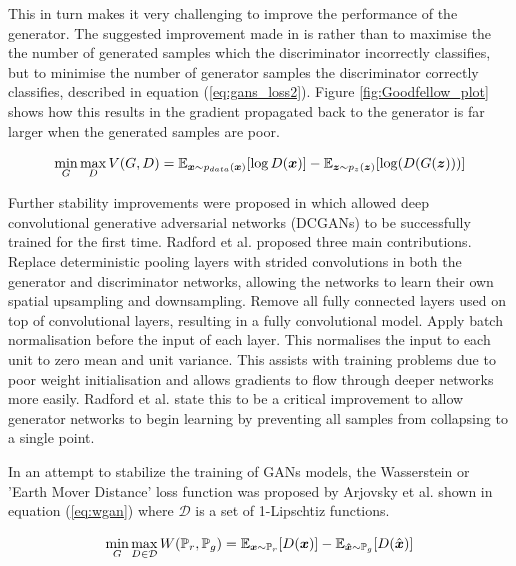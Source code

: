 This in turn makes it very challenging to improve the performance of the generator.
The suggested improvement made in \cite{Goodfellow2014} is rather than to maximise the the number of generated samples which the discriminator incorrectly classifies, but to minimise the number of generator samples the discriminator correctly classifies, described in equation (\ref{eq:gans_loss2}).
Figure \ref{fig:Goodfellow_plot} shows how this results in the gradient propagated back to the generator is far larger when the generated samples are poor.

\begin{equation} \label{eq:gans_loss2}
    \min_{G} \max_{D} V(G, D) = \mathbb{E}_{{\boldsymbol{{x}}} \sim p_{data}({\boldsymbol{{x}}})} [\log D({\boldsymbol{{x}}})]
                              - \mathbb{E}_{{\boldsymbol{{z}}} \sim p_{z}({\boldsymbol{{z}}})} [\log (D(G({\boldsymbol{{z}}})))]
\end{equation}
\quad

Further stability improvements were proposed in \cite{Radford2016} which allowed deep convolutional generative adversarial networks (DCGANs) to be successfully trained for the first time.
Radford et al. proposed three main contributions.
Replace deterministic pooling layers with strided convolutions in both the generator and discriminator networks, allowing the networks to learn their own spatial upsampling and downsampling.
Remove all fully connected layers used on top of convolutional layers, resulting in a fully convolutional model.
Apply batch normalisation \cite{Ioffe2015} before the input of each layer.
This normalises the input to each unit to zero mean and unit variance.
This assists with training problems due to poor weight initialisation and allows gradients to flow through deeper networks more easily.
Radford et al. state this to be a critical improvement to allow generator networks to begin learning by preventing all samples from collapsing to a single point. 

In an attempt to stabilize the training of GANs models, the Wasserstein or 'Earth Mover Distance' loss function was proposed by Arjovsky et al. \cite{Arjovsky2017} shown in equation (\ref{eq:wgan}) where $\mathcal{D}$ is a set of 1-Lipschtiz functions.

\begin{equation} \label{eq:wgan}
    \min_{G} \max_{D \in \mathcal{D}} W(\mathbb{P}_{r}, \mathbb{P}_{g}) =
            \mathbb{E}_{{\boldsymbol{{x}}} \sim \mathbb{P}_{r}} [D({\boldsymbol{{x}}})]
            -\mathbb{E}_{{\boldsymbol{{\hat{x}}}} \sim \mathbb{P}_{g}} [D(\hat{{\boldsymbol{{x}}}})]
\end{equation}
\quad


